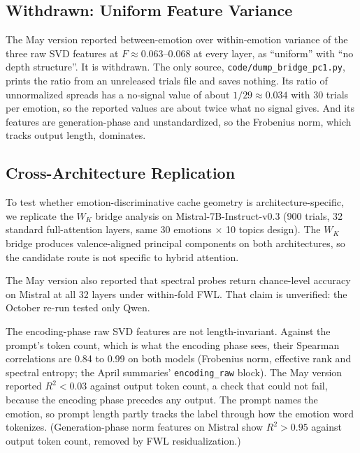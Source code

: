 \subsection{Withdrawn: Uniform Feature Variance}

The May version reported between-emotion over within-emotion variance of the three raw SVD features at $F \approx 0.063$--$0.068$ at every layer, as ``uniform'' with ``no depth structure''. It is withdrawn. The only source, \texttt{code/dump\_bridge\_pc1.py}, prints the ratio from an unreleased trials file and saves nothing. Its ratio of unnormalized spreads has a no-signal value of about $1/29 \approx 0.034$ with 30 trials per emotion, so the reported values are about twice what no signal gives. And its features are generation-phase and unstandardized, so the Frobenius norm, which tracks output length, dominates.

\subsection{Cross-Architecture Replication}
\label{sec:crossarch}

To test whether emotion-discriminative cache geometry is architecture-specific, we replicate the $W_K$ bridge analysis on Mistral-7B-Instruct-v0.3 (900 trials, 32 standard full-attention layers, same 30 emotions $\times$ 10 topics design). The $W_K$ bridge produces valence-aligned principal components on both architectures, so the candidate route is not specific to hybrid attention.

The May version also reported that spectral probes return chance-level accuracy on Mistral at all 32 layers under within-fold FWL. That claim is unverified: the October re-run tested only Qwen.

The encoding-phase raw SVD features are not length-invariant. Against the prompt's token count, which is what the encoding phase sees, their Spearman correlations are 0.84 to 0.99 on both models (Frobenius norm, effective rank and spectral entropy; the April summaries' \texttt{encoding\_raw} block). The May version reported $R^2 < 0.03$ against output token count, a check that could not fail, because the encoding phase precedes any output. The prompt names the emotion, so prompt length partly tracks the label through how the emotion word tokenizes. (Generation-phase norm features on Mistral show $R^2 > 0.95$ against output token count, removed by FWL residualization.)

